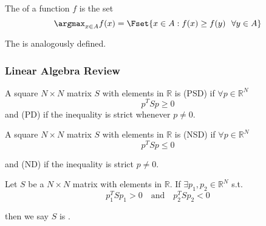 \documentclass{article}
\begin{document}
\begin{definition}
  The \keyword{$\argmax$} of a function $f$ is the set
  \[
    \argmax_{x \in A} f(x) = \Fset{x \in A: f(x) \ge f(y) ~~ \forall y \in A}
  \]

  The \keyword{$\argmin$} is analogously defined.
\end{definition}

\subsubsection{Linear Algebra Review}
\label{ssub:linear_algebra_review}

\begin{definition}
  A square $N \times N$ matrix $S$ with elements in $\mathbb{R}$ is  (PSD) if $\forall p \in \mathbb{R}^N$
  \[
    p^T S p \ge 0
  \]
and  (PD) if the inequality is strict whenever $p \ne 0$.
\end{definition}

\begin{definition}
  A square $N \times N$ matrix $S$ with elements in $\mathbb{R}$ is  (NSD) if $\forall p \in \mathbb{R}^N$
  \[
    p^T S p \le 0
  \]

  and  (ND) if the inequality is strict $p \ne 0$.
\end{definition}

\begin{definition}
  Let $S$ be a $N \times N$ matrix with elements in $\mathbb{R}$. If $\exists p_1, p_2 \in \mathbb{R}^N$ s.t.
  \[
    p_1^T S p_1 > 0
    \quad
    \text{and}
    \quad
    p_2^T S p_2 < 0
  \]

  then we say $S$ is .
\end{definition}
\end{document}
